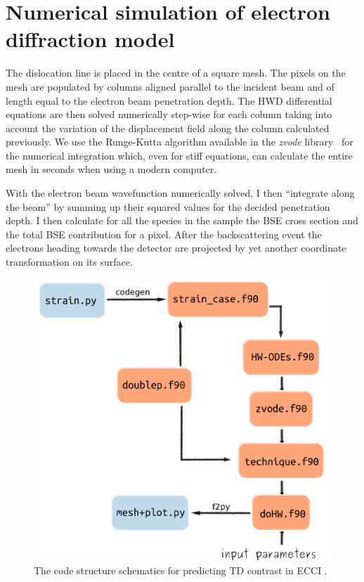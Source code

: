 \section{ Numerical simulation of electron diffraction model}
\label{sec:numerical}
The dislocation line is placed in the centre of a square mesh. The pixels on the mesh are populated by columns aligned parallel to the incident beam and of length equal to the electron beam penetration depth. The HWD differential equations are then solved numerically step-wise for each column taking into account the variation of the displacement field along the column calculated previously. We use the Runge-Kutta algorithm available in the \textit{zvode} library~\cite{Hindmarsh85} for the numerical integration which, even for stiff equations, can calculate the entire mesh in seconds when using a modern computer.

With the electron beam wavefunction numerically solved, I then ``integrate along the beam'' by summing up their squared values for the decided penetration depth. I then calculate for all the species in the sample the BSE cross section and the total BSE contribution for a pixel. After the backscattering event the electrons heading towards the detector are projected by yet another coordinate transformation on its surface.

\begin{figure}[ht]
    \centering
    \includegraphics[width=0.65\linewidth]{Figures/code.png}
    \caption{ The code structure  schematics for predicting TD contrast in ECCI . }
    \label{fig:code}
\end{figure}


